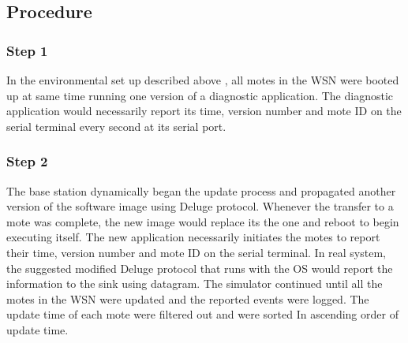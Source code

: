 \documentclass[conference,final]{IEEEtran}
\newcommand{\notedme}[1]{\raisebox{0pt}[0pt][0pt]{\pdfcomment[open=true,color=blue]{#1}}}
\begin{document}
\subsection*{Procedure}
\label{subsec:proc}
%
%
%
\subsubsection*{Step 1} 
In the environmental set up described above , all motes in the WSN were booted up at same time running one version of a diagnostic application. 
The diagnostic application would necessarily report its time, version number and mote ID on the serial terminal every second at its serial port. 


\subsubsection*{Step 2} 
The base station dynamically began the update process and propagated another version of the software image using Deluge protocol. %
Whenever the transfer to a mote was complete, the new image would replace its the one and reboot to begin executing itself.
The  new application necessarily initiates the motes to report their time, version number and mote ID on the serial terminal. 
In real system, the suggested modified Deluge protocol that runs with the OS would report the information to the sink using datagram.
The simulator continued until all the motes in the WSN were updated and the reported events were logged. 
The update time of each mote were filtered out  and were sorted In ascending order of update time.

\end{document}
